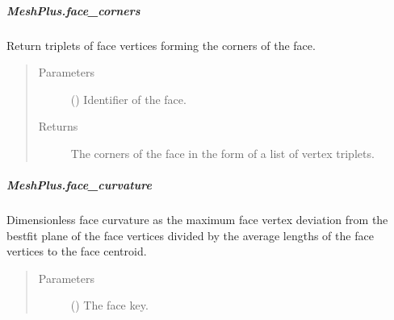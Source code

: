 \documentclass[letterpaper,10pt,english]{sphinxmanual}
\begin{document}
\begin{fulllineitems}
\subparagraph{MeshPlus.face\_corners}
\label{\detokenize{api/generated/directional_clustering.mesh.MeshPlus.face_corners:meshplus-face-corners}}\label{\detokenize{api/generated/directional_clustering.mesh.MeshPlus.face_corners::doc}}

\begin{fulllineitems}
\label{\detokenize{api/generated/directional_clustering.mesh.MeshPlus.face_corners:directional_clustering.mesh.MeshPlus.face_corners}}
Return triplets of face vertices forming the corners of the face.
\begin{quote}\begin{description}
\item[{Parameters}] \leavevmode
{} () \textendash{} Identifier of the face.

\item[{Returns}] \leavevmode
{} \textendash{} The corners of the face in the form of a list of vertex triplets.

\end{description}\end{quote}

\end{fulllineitems}



\subparagraph{MeshPlus.face\_curvature}
\label{\detokenize{api/generated/directional_clustering.mesh.MeshPlus.face_curvature:meshplus-face-curvature}}\label{\detokenize{api/generated/directional_clustering.mesh.MeshPlus.face_curvature::doc}}

\begin{fulllineitems}
\label{\detokenize{api/generated/directional_clustering.mesh.MeshPlus.face_curvature:directional_clustering.mesh.MeshPlus.face_curvature}}
Dimensionless face curvature as the maximum face vertex deviation from
the best\sphinxhyphen{}fit plane of the face vertices divided by the average lengths of
the face vertices to the face centroid.
\begin{quote}\begin{description}
\item[{Parameters}] \leavevmode
{} () \textendash{} The face key.


\end{description}
\end{quote}
\end{fulllineitems}
\end{fulllineitems}
\end{document}
